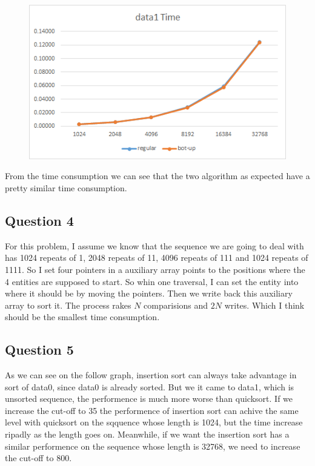 \documentclass[conference]{IEEEtran}
\begin{document}
\begin{figure}[H]
    \centerline{\includegraphics[scale=0.65]{Pic/pic9.png}}
\end{figure}

From the time consumption we can see that the two algorithm as expected have a pretty 
similar time consumption.

\subsection*{Question 4}
For this problem, I assume we know that the sequence we are going to deal with has 
1024 repeats of 1, 2048 repeats of 11, 4096 repeats of 111 and 1024 repeats of 1111.
So I set four pointers in a auxiliary array points to the positions where the 4 entities 
are supposed to start. So whin one traversal, I can set the entity into where it 
should be by moving the pointers. Then we write back this auxiliary array to sort it.
The process rakes $N$ comparisions and $2N$ writes. Which I think should be the smallest
time consumption.

\subsection*{Question 5}
As we can see on the follow graph, insertion sort can always take advantage in sort 
of data0, since data0 is already sorted. But we it came to data1, which is unsorted 
sequence, the performence is much more worse than quicksort. If we increase the cut-off
to 35 the performence of insertion sort can achive the same level with quicksort on 
the sqquence whose length is 1024, but the time increase ripadly as the length goes on.
Meanwhile, if we want the insertion sort has a similar performence on the sequence 
whose length is 32768, we need to increase the cut-off to 800.
\end{document}
